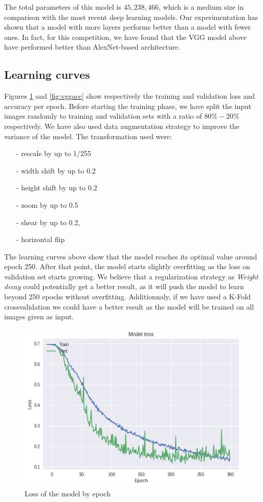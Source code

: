 \documentclass[a4paper]{article}
\begin{document}
The total parameters of this model is $45,238,466$, which is a medium size in comparison with the most recent deep learning models.
%
Our experimentation has shown that a model with more layers performs better than a model with fewer ones. In fact, for this competition, we have found that the VGG model above have performed better than AlexNet-based architecture.

\subsection{Learning curves}
Figures \ref{fig:vggloss} and \ref{fig:vggacc} show respectively the training and validation loss and accuracy per epoch.
%
%
Before starting the training phase, we have split the input images randomly to training and validation sets with a ratio of $80\%-20\%$ respectively.
%
We have also used data augmentation strategy to improve the variance of the model. The transformation used were:
\begin{itemize}
\setlength\itemsep{0em}
\item[-]rescale by up to 1/255
\item[-]width shift by up to 0.2
\item[-]height shift by up to 0.2
\item[-]zoom by up to 0.5
\item[-]shear by up to 0.2,
\item[-]horizontal flip

\end{itemize}
%
The learning curves above show that the model reaches its optimal value around epoch 250. After that point, the model starts slightly overfitting as the loss on validation set starts growing.
%
We believe that a regularization strategy as \textit{Weight decay} could potentially get a better result, as it will push the model to learn beyond 250 epochs without overfitting. Additionnaly, if we have used a K-Fold crossvalidation we could have a better result as the model will be trained on all images given as input.
%
\begin{figure}[h!]
	\centering
	\includegraphics[scale=.6]{VGGLoss_of2.png}
	\caption{Loss of the model by epoch}
	\label{fig:vggloss}
\end{figure}
\end{document}
